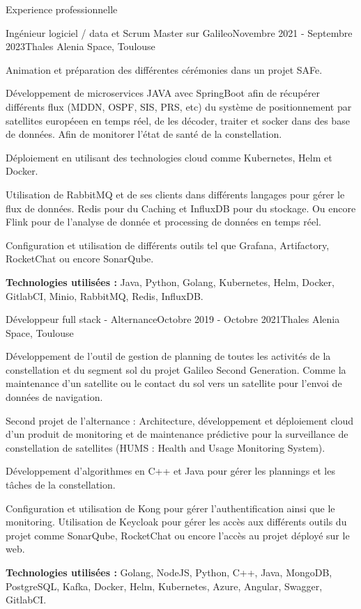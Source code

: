 \documentclass[
	10pt, %
]{resume} %
\begin{document}
\begin{rSection}{Experience professionnelle}
	\begin{rSubsection}{Ingénieur logiciel / data et Scrum Master sur Galileo}{Novembre 2021 - Septembre 2023}{Thales Alenia Space, Toulouse}{}
		\item Animation et préparation des différentes cérémonies dans un projet SAFe.
		\item Développement de microservices JAVA avec SpringBoot afin de récupérer différents flux (MDDN, OSPF, SIS, PRS, etc) du système de positionnement par satellites européeen en temps réel, de les décoder, traiter et socker dans des base de données. Afin de monitorer l'état de santé de la constellation. 
 		\item Déploiement en utilisant des technologies cloud comme Kubernetes, Helm et Docker.
 		\item Utilisation de RabbitMQ et de ses clients dans différents langages pour gérer le flux de données. Redis pour du Caching et InfluxDB pour du stockage. Ou encore Flink pour de l'analyse de donnée et processing de données en temps réel.
		\item Configuration et utilisation de différents outils tel que Grafana, Artifactory, RocketChat ou encore SonarQube.
		\item \textbf{Technologies utilisées : }Java, Python, Golang, Kubernetes, Helm, Docker, GitlabCI, Minio, RabbitMQ, Redis, InfluxDB.
	\end{rSubsection}

	\begin{rSubsection}{Développeur full stack - Alternance}{Octobre 2019 - Octobre 2021}{Thales Alenia Space, Toulouse}{}
 		\item Développement de l'outil de gestion de planning de toutes les activités de la constellation et du segment sol du projet Galileo Second Generation. Comme la maintenance d'un satellite ou le contact du sol vers un satellite pour l'envoi de données de navigation.
 		\item Second projet de l'alternance : Architecture, développement et déploiement cloud d'un produit de monitoring et de maintenance prédictive 
			pour la surveillance de constellation de satellites (HUMS : Health and Usage Monitoring System).
		\item Développement d'algorithmes en C++ et Java pour gérer les plannings et les tâches de la constellation.
		\item Configuration et utilisation de Kong pour gérer l'authentification ainsi que le monitoring. Utilisation de Keycloak pour gérer les accès aux différents outils du projet comme SonarQube, RocketChat ou encore l'accès au projet déployé sur le web.
		\item \textbf{Technologies utilisées :} Golang, NodeJS, Python, C++, Java, MongoDB, PostgreSQL, Kafka, Docker, Helm, Kubernetes, Azure, Angular, Swagger, GitlabCI.
	\end{rSubsection}


\end{rSection}
\end{document}
